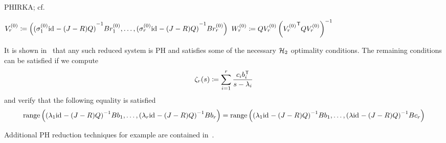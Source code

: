 \begin{algorithm}\label{alg:ph-irka}
    \caption{\ac{PHIRKA}; cf.~\cite[Algorithm~1]{Gugercin2012}}
    $V_r^{(0)} \coloneqq \left( {(\sigma_1^{(0)} \text{id}_{} - (J - R) Q)}^{-1} B r_1^{(0)}, \dots, {(\sigma_r^{(0)} \text{id}_{} - (J - R) Q)}^{-1} B r_r^{(0)} \right)$\;
    $W_r^{(0)} \coloneqq Q V_r^{(0)} \left( {V_r^{(0)}}^{\mkern1mu \mathsf{T}} Q V_r^{(0)} \right)^{-1}$\;
\end{algorithm}

It is shown in~\cite[Theorem~11]{Gugercin2012} that any such reduced system is \ac{PH} and satisfies some of the necessary $\mathcal{H}_2$ optimality conditions.
The remaining conditions can be satisfied if we compute
\begin{equation*}
    \zeta_r(s) \coloneqq \sum\limits_{i = 1}^r \frac{c_i b_i^{\mkern1mu \mathsf{T}}}{s - \lambda_i}
\end{equation*}
and verify that the following equality is satisfied
\begin{equation*}
    \mathop{}\!\mathrm{range}\left({(\lambda_1 \text{id}_{} - (J - R) Q)}^{-1} B b_1, \dots, {(\lambda_r \text{id}_{} - (J - R) Q)}^{-1} B b_r\right) = \mathop{}\!\mathrm{range}\left({(\lambda_1 \text{id}_{} - (J - R) Q)}^{-1} B b_1, \dots, {(\lambda \text{id}_{} - (J - R) Q)}^{-1} B c_r\right)
\end{equation*}


\begin{remark}
    Additional \ac{PH} reduction techniques for example are contained in~\cite{Polyuga2010, Chaturantabut2016, Cherifi2019, BGD2020}.
\end{remark}
